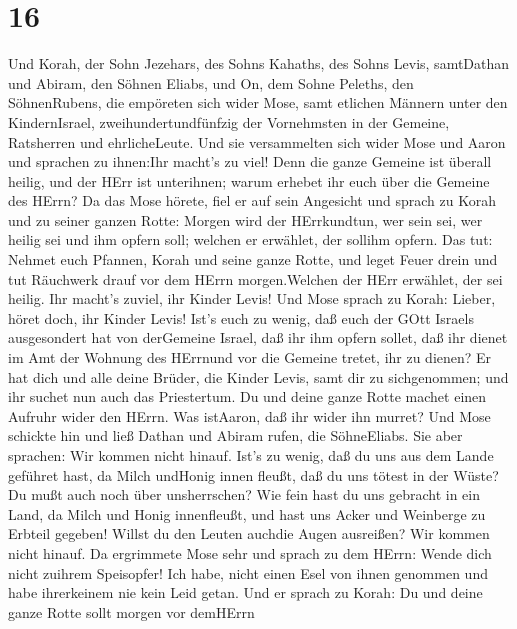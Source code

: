 \hypertarget{section-15}{%
\section{16}\label{section-15}}

 Und Korah, der Sohn Jezehars, des Sohns Kahaths, des Sohns
Levis, samtDathan und Abiram, den Söhnen Eliabs, und On, dem Sohne
Peleths, den SöhnenRubens,  die empöreten sich wider Mose,
samt etlichen Männern unter den KindernIsrael, zweihundertundfünfzig der
Vornehmsten in der Gemeine, Ratsherren und ehrlicheLeute. 
Und sie versammelten sich wider Mose und Aaron und sprachen zu ihnen:Ihr
macht's zu viel! Denn die ganze Gemeine ist überall heilig, und der HErr
ist unterihnen; warum erhebet ihr euch über die Gemeine des HErrn?
 Da das Mose hörete, fiel er auf sein Angesicht 
und sprach zu Korah und zu seiner ganzen Rotte: Morgen wird der
HErrkundtun, wer sein sei, wer heilig sei und ihm opfern soll; welchen
er erwählet, der sollihm opfern.  Das tut: Nehmet euch
Pfannen, Korah und seine ganze Rotte,  und leget Feuer drein
und tut Räuchwerk drauf vor dem HErrn morgen.Welchen der HErr erwählet,
der sei heilig. Ihr macht's zuviel, ihr Kinder Levis!  Und
Mose sprach zu Korah: Lieber, höret doch, ihr Kinder Levis! 
Ist's euch zu wenig, daß euch der GOtt Israels ausgesondert hat von
derGemeine Israel, daß ihr ihm opfern sollet, daß ihr dienet im Amt der
Wohnung des HErrnund vor die Gemeine tretet, ihr zu dienen?
 Er hat dich und alle deine Brüder, die Kinder Levis, samt
dir zu sichgenommen; und ihr suchet nun auch das Priestertum.
 Du und deine ganze Rotte machet einen Aufruhr wider den
HErrn. Was istAaron, daß ihr wider ihn murret?  Und Mose
schickte hin und ließ Dathan und Abiram rufen, die SöhneEliabs. Sie aber
sprachen: Wir kommen nicht hinauf.  Ist's zu wenig, daß du
uns aus dem Lande geführet hast, da Milch undHonig innen fleußt, daß du
uns tötest in der Wüste? Du mußt auch noch über unsherrschen?
 Wie fein hast du uns gebracht in ein Land, da Milch und
Honig innenfleußt, und hast uns Acker und Weinberge zu Erbteil gegeben!
Willst du den Leuten auchdie Augen ausreißen? Wir kommen nicht hinauf.
 Da ergrimmete Mose sehr und sprach zu dem HErrn: Wende
dich nicht zuihrem Speisopfer! Ich habe, nicht einen Esel von ihnen
genommen und habe ihrerkeinem nie kein Leid getan.  Und er
sprach zu Korah: Du und deine ganze Rotte sollt morgen vor demHErrn
